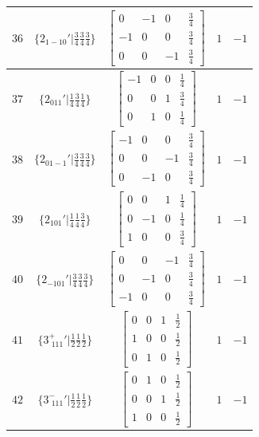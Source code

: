 \documentclass[fleqn,8pt]{jsarticle}
\begin{document}
\begin{longtable}{ccccc}
$ 36 $ & $ \{2{}_{1-10}{}'|\frac{3}{4} \frac{3}{4} \frac{3}{4}\} $ & $ \begin{bmatrix} 0 & -1 & 0 & \frac{3}{4} \\ -1 & 0 & 0 & \frac{3}{4} \\ 0 & 0 & -1 & \frac{3}{4} \end{bmatrix} $ & $ 1 $ & $ -1 $ \\ \hline
$ 37 $ & $ \{2{}_{011}{}'|\frac{1}{4} \frac{3}{4} \frac{1}{4}\} $ & $ \begin{bmatrix} -1 & 0 & 0 & \frac{1}{4} \\ 0 & 0 & 1 & \frac{3}{4} \\ 0 & 1 & 0 & \frac{1}{4} \end{bmatrix} $ & $ 1 $ & $ -1 $ \\ \hline
$ 38 $ & $ \{2{}_{01-1}{}'|\frac{3}{4} \frac{3}{4} \frac{3}{4}\} $ & $ \begin{bmatrix} -1 & 0 & 0 & \frac{3}{4} \\ 0 & 0 & -1 & \frac{3}{4} \\ 0 & -1 & 0 & \frac{3}{4} \end{bmatrix} $ & $ 1 $ & $ -1 $ \\ \hline
$ 39 $ & $ \{2{}_{101}{}'|\frac{1}{4} \frac{1}{4} \frac{3}{4}\} $ & $ \begin{bmatrix} 0 & 0 & 1 & \frac{1}{4} \\ 0 & -1 & 0 & \frac{1}{4} \\ 1 & 0 & 0 & \frac{3}{4} \end{bmatrix} $ & $ 1 $ & $ -1 $ \\ \hline
$ 40 $ & $ \{2{}_{-101}{}'|\frac{3}{4} \frac{3}{4} \frac{3}{4}\} $ & $ \begin{bmatrix} 0 & 0 & -1 & \frac{3}{4} \\ 0 & -1 & 0 & \frac{3}{4} \\ -1 & 0 & 0 & \frac{3}{4} \end{bmatrix} $ & $ 1 $ & $ -1 $ \\ \hline
$ 41 $ & $ \{3^{+}_{\,\,111}{}'|\frac{1}{2} \frac{1}{2} \frac{1}{2}\} $ & $ \begin{bmatrix} 0 & 0 & 1 & \frac{1}{2} \\ 1 & 0 & 0 & \frac{1}{2} \\ 0 & 1 & 0 & \frac{1}{2} \end{bmatrix} $ & $ 1 $ & $ -1 $ \\ \hline
$ 42 $ & $ \{3^{-}_{\,\,111}{}'|\frac{1}{2} \frac{1}{2} \frac{1}{2}\} $ & $ \begin{bmatrix} 0 & 1 & 0 & \frac{1}{2} \\ 0 & 0 & 1 & \frac{1}{2} \\ 1 & 0 & 0 & \frac{1}{2} \end{bmatrix} $ & $ 1 $ & $ -1 $ \\ \hline

\end{longtable}
\end{document}
